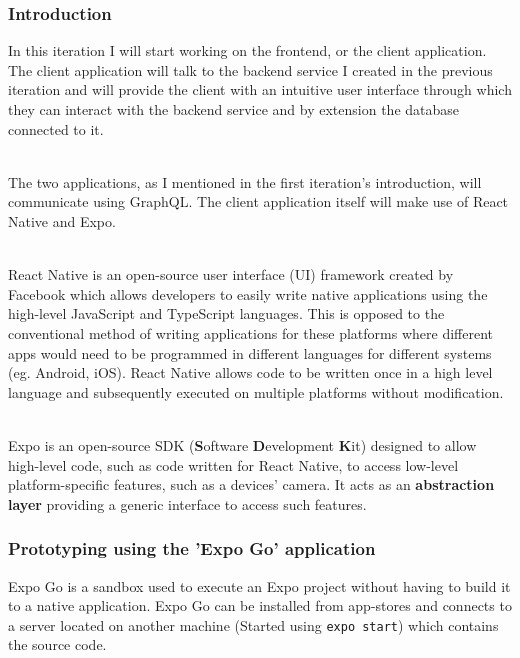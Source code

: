 \documentclass[../../main.tex]{subfiles}
\begin{document}
\subsubsection{Introduction}

In this iteration I will start working on the frontend, or the client application. The client
application will talk to the backend service I created in the previous iteration and will
provide the client with an intuitive user interface through which they can interact with the
backend service and by extension the database connected to it.

\noindent \\ The two applications, as I mentioned in the first iteration's introduction,
will communicate using GraphQL. The client application itself will make use of
React Native and Expo.

\noindent \\ React Native is an open-source user interface (UI) framework created by
Facebook which allows developers to easily write native applications using
the high-level JavaScript and TypeScript languages. This is opposed to the conventional method
of writing applications for these platforms where different apps would need to be programmed
in different languages for different systems (eg. Android, iOS). React Native allows code to
be written once in a high level language and subsequently executed on multiple
platforms without modification.

\noindent \\ Expo is an open-source SDK (\textbf{S}oftware \textbf{D}evelopment \textbf{K}it) designed to allow high-level code, such as code
written for React Native, to access low-level platform-specific features, such as a devices' camera.
It acts as an \textbf{abstraction layer} providing a generic interface to access such features.

\begin{comment}
\noindent \\ Therefore, the first task to do is to initialise an Expo project and install
our dependencies, notably the Apollo GraphQL client.\
\end{comment}

\subsubsection{Prototyping using the 'Expo Go' application}

Expo Go is a sandbox used to execute an Expo project without having to build it to a native application.
Expo Go can be installed from app-stores and connects to a server located
on another machine (Started using \lstinline{expo start}) which contains the source code.
\end{document}

